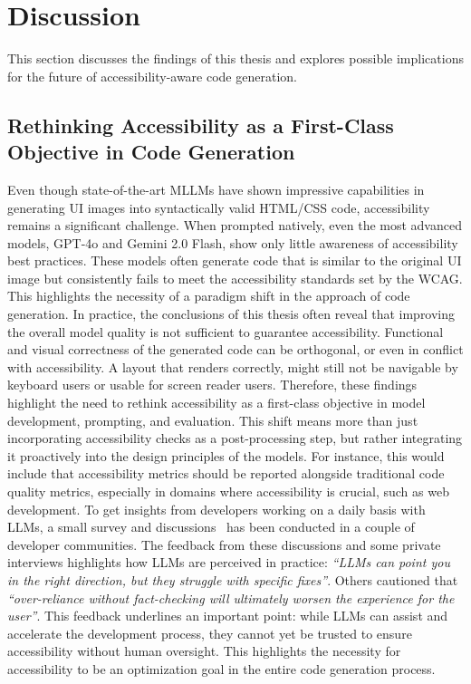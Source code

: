 \chapter{Discussion}\label{chapter:discussion}
This section discusses the findings of this thesis 
and explores possible implications for the future 
of accessibility-aware code generation.

\section{Rethinking Accessibility as a First-Class Objective in Code Generation}
Even though state-of-the-art MLLMs have shown impressive 
capabilities in generating UI images into syntactically 
valid HTML/CSS code, accessibility remains a significant 
challenge. When prompted natively, even the most advanced models, 
GPT-4o and Gemini 2.0 Flash, show only little awareness 
of accessibility best practices.
These models often generate code that is similar to the 
original UI image but consistently fails to meet 
the accessibility standards set by the WCAG.
This highlights the necessity of a paradigm 
shift in the approach of code generation. 
In practice, the conclusions of this thesis 
often reveal that improving 
the overall model quality is not sufficient to guarantee
accessibility. 
Functional and visual correctness of the generated code 
can be orthogonal, or even in conflict with accessibility. 
A layout that renders correctly, might still not be navigable 
by keyboard users or usable for screen reader users.\newline 
Therefore, these findings highlight the need to rethink 
accessibility as a first-class objective in model
development, prompting, and evaluation. This shift 
means more than just incorporating accessibility 
checks as a post-processing step, but rather
integrating it proactively into the design principles 
of the models. For instance, this would include that 
accessibility metrics should be reported alongside traditional 
code quality metrics, especially in domains 
where accessibility is crucial, such as web development.\newline 
To get insights from developers working on 
a daily basis with LLMs, a small survey and discussions~\cite{feng2025ux, lutz2025mot} 
has been conducted in a couple of developer communities.
The feedback from these discussions and some private interviews 
highlights how 
LLMs are perceived in practice: \textit{``LLMs can point 
you in the right direction, but they struggle with specific fixes''}.
Others cautioned that \textit{``over-reliance without fact-checking will 
ultimately worsen the experience for the user''}. This 
feedback underlines an important point: while LLMs can 
assist and accelerate the development process, they cannot yet
be trusted to ensure accessibility without human oversight. 
This highlights the necessity for accessibility to be 
an optimization goal in the entire code generation process.

